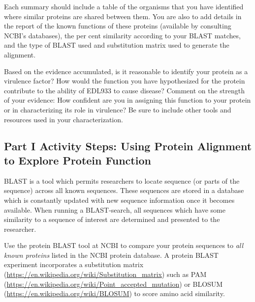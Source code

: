 Each summary should include a table of the organisms that you have identified where similar proteins are shared between them. You are also to add details in the report of the known functions of these proteins (available by consulting NCBI's databases), the per cent similarity according to your BLAST matches, and the type of BLAST used and substitution matrix used to generate the alignment.  

Based on the evidence accumulated, is it reasonable to identify your protein as a virulence factor?  How would the function you have hypothesized for the protein contribute to the ability of EDL933 to cause disease?  Comment on the strength of your evidence:  How confident are you in assigning this function to your protein or in characterizing its role in virulence?  Be sure to include other tools and resources used in your characterization.



\vspace*{-.1in}
\subsection*{Part I Activity Steps: Using Protein Alignment to Explore Protein Function}
\vspace*{-.1in} 
BLAST is a tool which permits researchers to locate sequence (or parts of the sequence) across all known sequences. These sequences are stored in a database which is constantly updated with new sequence information once it becomes available. When running a BLAST-search, all sequences which have some similarity to a sequence of interest are determined and presented to the researcher.

Use the protein BLAST tool at NCBI to compare your protein sequences to \emph{all known proteins} listed in the NCBI protein database. A protein BLAST experiment incorporates a substitution matrix (\url{https://en.wikipedia.org/wiki/Substitution_matrix}) such as PAM (\url{https://en.wikipedia.org/wiki/Point_accepted_mutation}) or BLOSUM (\url{https://en.wikipedia.org/wiki/BLOSUM}) to score amino acid similarity.  

